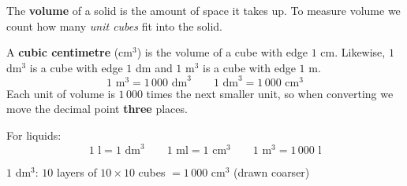 \gdef\cuboidVT#1#2#3#4{\coordinate (Q) at (0,0); \coordinate (P) at (#1,0); \coordinate (C) at (#1,#3); \coordinate (D) at (0,#3);
 \coordinate (M) at ({0.5*#2},{0.38*#2}); \coordinate (N) at ($(P)+(M)$); \coordinate (B) at ($(C)+(M)$); \coordinate (A) at ($(D)+(M)$);
 \fill[tmBlue!6] (Q)--(P)--(C)--(D)--cycle; \fill[tmBlue!3] (D)--(C)--(B)--(A)--cycle; \fill[tmBlue!13] (P)--(N)--(B)--(C)--cycle;
 \ifdim #4pt>0pt \coordinate (wl) at (0,#4);
  \fill[cyan!30] (Q)--(P)--($(P)+(wl)$)--($(Q)+(wl)$)--cycle; \fill[cyan!45] (P)--(N)--($(N)+(wl)$)--($(P)+(wl)$)--cycle;
  \fill[cyan!16] ($(Q)+(wl)$)--($(P)+(wl)$)--($(N)+(wl)$)--($(M)+(wl)$)--cycle;
  \draw[cyan!60!black,line width=0.5pt] ($(Q)+(wl)$)--($(P)+(wl)$)--($(N)+(wl)$);
  \draw[cyan!60!black,line width=0.4pt,dashed] ($(N)+(wl)$)--($(M)+(wl)$)--($(Q)+(wl)$); \fi
 \draw[geo,dashed,line width=0.6pt] (M)--(Q) (M)--(N) (M)--(A);
 \draw[geo] (Q)--(P)--(C)--(D)--cycle (D)--(A)--(B)--(C) (P)--(N)--(B);}
\begin{knowbox}
\begin{minipage}[t]{0.6\linewidth}
The \textbf{volume} of a solid is the amount of space it takes up. To measure volume we count how many \emph{unit cubes} fit into the solid.\par
\smallskip
A \textbf{cubic centimetre} (cm$^3$) is the volume of a cube with edge $1$ cm. Likewise, $1$ dm$^3$ is a cube with edge $1$ dm and $1$ m$^3$ is a cube with edge $1$ m.
\[1\text{ m}^3=1\,000\text{ dm}^3\qquad 1\text{ dm}^3=1\,000\text{ cm}^3\]
Each unit of volume is $1\,000$ times the next smaller unit, so when converting we move the decimal point \textbf{three} places.\par
\smallskip
For liquids:\[1\text{ l}=1\text{ dm}^3\qquad 1\text{ ml}=1\text{ cm}^3\qquad 1\text{ m}^3=1\,000\text{ l}\]\vspace{-\baselineskip}
\end{minipage}\hfill
\begin{minipage}[t]{0.36\linewidth}\vspace{6pt}\centering
{}\par\smallskip
{\scriptsize\color{Slate} $1$ dm$^3$: $10$ layers of $10\times10$ cubes $=1\,000$ cm$^3$ (drawn coarser)}
\end{minipage}
\end{knowbox}
